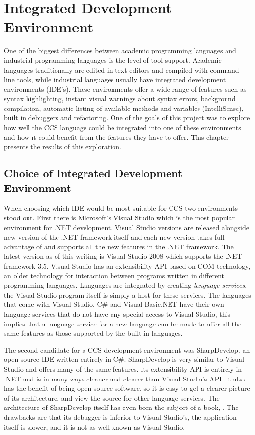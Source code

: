 \chapter{Integrated Development Environment}\label{ch:ide}

	One of the biggest differences between academic programming languages and 
	industrial programming languages is the level of tool support. Academic 
	languages traditionally are edited in text editors and compiled with command 
	line tools, while industrial languages usually have integrated development 
	environments (IDE's). These environments offer a wide range of features such 
	as syntax highlighting, instant visual warnings about syntax errors, 
	background compilation, automatic listing of available methods and variables 
	(IntelliSense), built in debuggers and refactoring. One of the goals of this 
	project was to explore how well the CCS language could be integrated into 
	one of these environments and how it could benefit from the features they 
	have to offer. This chapter presents the results of this exploration. 
	
\section{Choice of Integrated Development Environment}
	
	When choosing which IDE would be most suitable for CCS two environments 
	stood out. First there is Microsoft's Visual Studio which is the most 
	popular environment for .NET development. Visual Studio versions are 
	released alongside new version of the .NET framework itself and each new 
	version takes full advantage of and supports all the new features in the 
	.NET framework. The latest version as of this writing is Visual Studio 2008 
	which supports the .NET framework 3.5. Visual Studio has an extensibility 
	API based on COM technology, an older technology for interaction between 
	programs written in different programming languages. Languages are 
	integrated by creating \textit{language services}, the Visual Studio program 
	itself is simply a host for these services. The languages that come with 
	Visual Studio, C\# and Visual Basic.NET have their own language services 
	that do not have any special access to Visual Studio, this implies that a 
	language service for a new language can be made to offer all the same 
	features as those supported by the built in languages.
	
	The second candidate for a CCS development environment was SharpDevelop, an 
	open source IDE written entirely in C\#. SharpDevelop is very similar to 
	Visual Studio and offers many of the same features. Its extensibility API is 
	entirely in .NET and is in many ways cleaner and clearer than Visual 
	Studio's API. It also has the benefit of being open source software, so it 
	is easy to get a clearer picture of its architecture, and view the source 
	for other language services. The architecture of SharpDevelop itself has 
	even been the subject of a book, \cite{sharpdevelop}. The drawbacks
	are that its debugger is inferior to Visual Studio's, the application itself
	is slower, and it is not as well known as Visual Studio.
	
